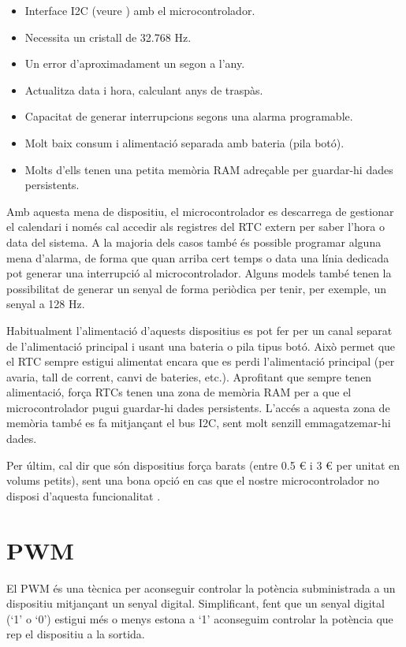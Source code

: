 \begin{itemize}
 \item Interface \gls{I2C} (veure ) amb el microcontrolador.
 \item Necessita un cristall de 32.768 Hz.
 \item Un error d'aproximadament un segon a l'any.
 \item Actualitza data i hora, calculant anys de traspàs.
 \item Capacitat de generar interrupcions segons una alarma programable.
 \item Molt baix consum i alimentació separada amb bateria (pila botó).
 \item Molts d'ells tenen una petita memòria RAM adreçable per guardar-hi dades persistents.
\end{itemize}

Amb aquesta mena de dispositiu, el microcontrolador es descarrega de gestionar el calendari i només cal accedir als registres del RTC extern per saber l'hora o data del sistema. A la majoria dels casos també és possible programar alguna mena d'alarma, de forma que quan arriba cert temps o data una línia dedicada pot generar una interrupció al microcontrolador. Alguns models també tenen la possibilitat de generar un senyal de forma periòdica per tenir, per exemple, un senyal a 128 Hz.

Habitualment l'alimentació d'aquests dispositius es pot fer per un canal separat de l'alimentació principal i usant una bateria o pila tipus botó. Això permet que el RTC sempre estigui alimentat encara que es perdi l'alimentació principal (per avaria, tall de corrent, canvi de bateries, etc.). Aprofitant que sempre tenen alimentació, força RTCs tenen una zona de memòria RAM per a que el microcontrolador pugui guardar-hi dades persistents. L'accés a aquesta zona de memòria també es fa mitjançant el bus \gls{I2C}, sent molt senzill emmagatzemar-hi dades.

Per últim, cal dir que són dispositius força barats (entre 0.5 € i 3 € per unitat en volums petits), sent una bona opció en cas que el nostre microcontrolador no disposi d'aquesta funcionalitat \cite{RTCDS1}\cite{RTCDS2}\cite{RTCDS3}.

\chapter{PWM}
\label{sub:PWM}
El \gls{PWM} és una tècnica per aconseguir controlar la potència subministrada a un dispositiu mitjançant un senyal digital. Simplificant, fent que un senyal digital (‘1' o ‘0') estigui més o menys estona a ‘1' aconseguim controlar la potència que rep el dispositiu a la sortida.

